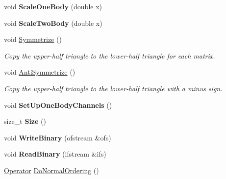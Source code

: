 \begin{DoxyCompactItemize}
\item 
void {\bfseries Scale\+One\+Body} (double x)\hypertarget{classOperator_a5466cc965277b75b14b60918f4d652ab}{}\label{classOperator_a5466cc965277b75b14b60918f4d652ab}

\item 
void {\bfseries Scale\+Two\+Body} (double x)\hypertarget{classOperator_af1f244c4856d11c21f94b6c6cd24a555}{}\label{classOperator_af1f244c4856d11c21f94b6c6cd24a555}

\item 
void \hyperlink{classOperator_a98d4075d734523186162492a4a45b420}{Symmetrize} ()\hypertarget{classOperator_a98d4075d734523186162492a4a45b420}{}\label{classOperator_a98d4075d734523186162492a4a45b420}

\begin{DoxyCompactList}\small\item\em Copy the upper-\/half triangle to the lower-\/half triangle for each matrix. \end{DoxyCompactList}\item 
void \hyperlink{classOperator_a21a37daa051c248109153e6502b8280f}{Anti\+Symmetrize} ()\hypertarget{classOperator_a21a37daa051c248109153e6502b8280f}{}\label{classOperator_a21a37daa051c248109153e6502b8280f}

\begin{DoxyCompactList}\small\item\em Copy the upper-\/half triangle to the lower-\/half triangle with a minus sign. \end{DoxyCompactList}\item 
void {\bfseries Set\+Up\+One\+Body\+Channels} ()\hypertarget{classOperator_ad6168f16f6c0b2cf70a1fc0676e70523}{}\label{classOperator_ad6168f16f6c0b2cf70a1fc0676e70523}

\item 
size\+\_\+t {\bfseries Size} ()\hypertarget{classOperator_a953ce26eec380dd538bd288009f4643e}{}\label{classOperator_a953ce26eec380dd538bd288009f4643e}

\item 
void {\bfseries Write\+Binary} (ofstream \&ofs)\hypertarget{classOperator_a422206b98c49d82f9edc21c8e69b4613}{}\label{classOperator_a422206b98c49d82f9edc21c8e69b4613}

\item 
void {\bfseries Read\+Binary} (ifstream \&ifs)\hypertarget{classOperator_a40fdb2790aba35e093725ff897b0e0cc}{}\label{classOperator_a40fdb2790aba35e093725ff897b0e0cc}

\item 
\hyperlink{classOperator}{Operator} \hyperlink{classOperator_a622880b91a902c832b867c6447a262e7}{Do\+Normal\+Ordering} ()\hypertarget{classOperator_a622880b91a902c832b867c6447a262e7}{}\label{classOperator_a622880b91a902c832b867c6447a262e7}


\end{DoxyCompactItemize}
